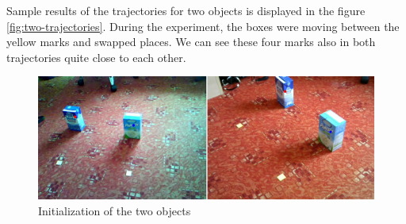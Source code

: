 Sample results of the trajectories for two objects is displayed in the figure
\ref{fig:two-trajectories}. During the experiment, the boxes were moving
between the yellow marks and swapped places. We can see these four marks also in
both trajectories quite close to each other. 

\begin{figure}[p]
\includegraphics[width=\linewidth]{img/experiments/two-objects.png}
\caption{Initialization of the two objects}
\label{fig:two-init}
\end{figure}

